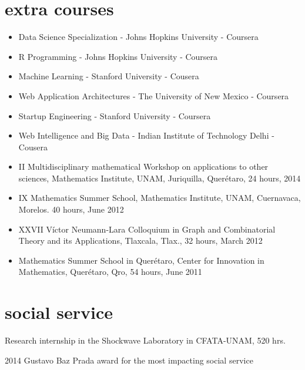 \documentclass[]{friggeri-cv}
\begin{document}
\section{extra courses}
\begin{itemize}
\item Data Science Specialization - Johns Hopkins University - Coursera
\item R Programming - Johns Hopkins University - Coursera
\item Machine Learning - Stanford University - Cousera
\item Web Application Architectures - The University of New Mexico - Coursera
\item Startup Engineering - Stanford University - Coursera
\item Web Intelligence and Big Data - Indian Institute of Technology Delhi - Cousera
\item II Multidisciplinary mathematical Workshop on applications to other sciences,  Mathematics Institute, UNAM, Juriquilla, Quer\'{e}taro, 24 hours, 2014
\item IX Mathematics Summer School, Mathematics Institute, UNAM, Cuernavaca, Morelos. 40 hours, June 2012
\item XXVII  V\'{i}ctor Neumann-Lara  Colloquium in Graph and Combinatorial Theory and its Applications, Tlaxcala, Tlax., 32 hours, March 2012
\item Mathematics Summer School in Quer\'{e}taro, Center for Innovation in Mathematics, Quer\'{e}taro, Qro, 54 hours, June 2011
\end{itemize}

\section{social service}
Research internship in the Shockwave Laboratory in CFATA-UNAM, 520 hrs.

2014 Gustavo Baz Prada award for the most impacting social service
\end{document}
